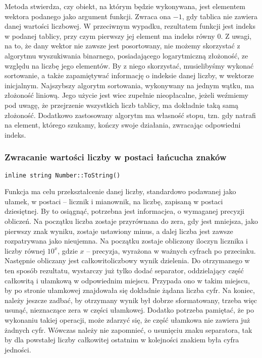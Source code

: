 \documentclass[twoside,a4paper]{book}
\begin{document}
Metoda stwierdza, czy obiekt, na którym będzie wykonywana, jest elementem wektora podanego jako argument funkcji. Zwraca ona $-1$, gdy tablica nie zawiera danej wartości liczbowej. W przeciwnym wypadku, rezultatem funkcji jest indeks w podanej tablicy, przy czym pierwszy jej element ma indeks równy $0$. Z uwagi, na to, że dany wektor nie zawsze jest posortowany, nie możemy skorzystać z algorytmu wyszukiwania binarnego, posiadającego logarytmiczną złożoność, ze względu na liczbę jego elementów. By z niego skorzystać, musielibyśmy wykonać sortowanie, a także zapamiętywać informację o indeksie danej liczby, w wektorze inicjalnym. Najszybszy algorytm sortowania, wykonywany na jednym wątku, ma złożoność liniową. Jego użycie jest wiec zupełnie nieopłacalne, jeżeli weźmiemy pod uwagę, że przejrzenie wszystkich liczb tablicy, ma dokładnie taką samą złożoność. Dodatkowo zastosowany algorytm ma własność stopu, tzn. gdy natrafi na element, którego szukamy, kończy swoje działania, zwracając odpowiedni indeks.
\\

\subsubsection{Zwracanie wartości liczby w postaci łańcucha znaków}
\begin{lstlisting}
inline string Number::ToString()
\end{lstlisting}

Funkcja ma celu przekształcenie danej liczby, standardowo podawanej jako ułamek, w postaci -- licznik i mianownik, na liczbę, zapisaną w postaci dziesiętnej. By to osiągnąć, potrzebna jest informacjea, o wymaganej precyzji obliczeń. Na początku liczba zostaje przyrównana do zera, gdy jest mniejsza, jako pierwszy znak wyniku, zostaje ustawiony minus, a dalej liczba jest zawsze rozpatrywana jako nieujemna. Na początku zostaje obliczony iloczyn licznika i liczby równej $10^x$, gdzie $x$ -- precyzja, wyrażona w ważnych cyfrach po przecinku. Następnie obliczany jest całkowitoliczbowy wynik dzielenia. Do otrzymanego w ten sposób rezultatu, wystarczy już tylko dodać separator, oddzielający część całkowitą i ułamkową w odpowiednim miejscu. Przypada ono w takim miejscu, by po stronie ułamkowej znajdowała się dokładnie żądana liczba cyfr. Na koniec, należy jeszcze zadbać, by otrzymany wynik był dobrze sformatowany, trzeba więc usunąć, nieznaczące zera w części ułamkowej. Dodatko potrzeba pamiętać, że po wykonaniu takiej operacji, może zdarzyć się, że część ułamkowa nie zawiera już żadnych cyfr. Wówczas należy nie zapomnieć, o usunięciu znaku separatora, tak by dla powstałej liczby całkowitej ostatnim w kolejności znakiem była cyfra jedności.
\\
\end{document}
